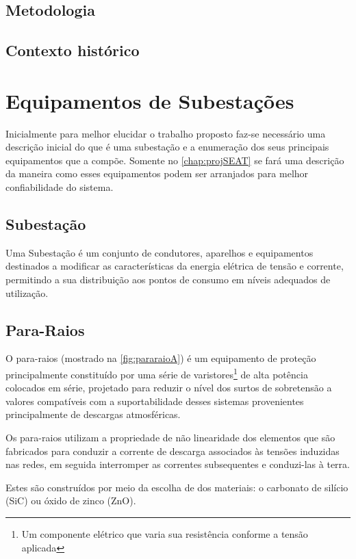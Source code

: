 	\section{Metodologia}
	\textcolor{red}{\lipsum[1-2]}

	\section{Contexto histórico}
		



\chapter{Equipamentos de Subestações}
	\label{chap:equipSE}
	Inicialmente para melhor elucidar o trabalho proposto faz-se necessário uma descrição inicial do que é uma subestação e a enumeração dos seus principais equipamentos que a compõe. Somente no \autoref{chap:projSEAT} se fará uma descrição da maneira como esses equipamentos podem ser arranjados para melhor confiabilidade do sistema.
	\section*{Subestação}
	Uma Subestação é um conjunto de condutores, aparelhos e equipamentos destinados a modificar as características da energia elétrica de tensão e corrente, permitindo a sua distribuição aos pontos de consumo em níveis adequados de utilização.\cite{instElet}

	\section{Para-Raios}
		O para-raios (mostrado na \autoref{fig:pararaioA}) é um equipamento de proteção principalmente constituído por uma série de varistores\footnote{Um componente elétrico que varia sua resistência conforme a tensão aplicada\cite[p. 413]{BellSytemHistory}} de alta potência colocados em série, projetado para reduzir o nível dos surtos de sobretensão a valores compatíveis com a suportabilidade desses sistemas provenientes principalmente de descargas atmosféricas.\par
		Os para-raios utilizam a propriedade de não linearidade dos elementos que são fabricados para conduzir a corrente de descarga associados às tensões induzidas nas redes, em seguida interromper as correntes subsequentes e conduzi-las à terra.\par
		Estes são construídos por meio da escolha de dos materiais: o carbonato de silício (SiC) ou óxido de zinco (ZnO). 

